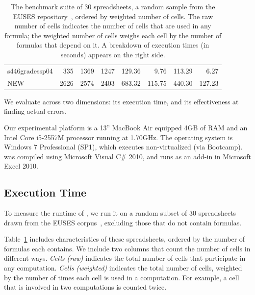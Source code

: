 \begin{table}[!t]
\begin{tabular}{l|rrr||r|rrr}
\small{s446gradessp04} & \small{335} & \small{1369} & \small{1247} & \small{129.36} & \small{9.76} & \small{113.29} & \small{6.27} \\ 
\small{NEW} & \small{2626} & \small{2574} & \small{2403} & \small{683.32} & \small{115.75} & \small{440.30} & \small{127.23} \\ 
    \end{tabular}%
  \caption{The benchmark suite of 30 spreadsheets, a random sample from the EUSES repository~\cite{Fisher:2005:ESC:1082983.1083242}, ordered by weighted number of cells. The raw number of cells indicates the number of cells that are used in any formula; the weighted number of cells weighs each cell by the number of formulas that depend on it. A breakdown of \checkcell{} execution times (in seconds) appears on the right side.\label{tab:spreadsheet_characteristics}}
\end{table}

We evaluate \checkcell{} across two dimensions: its execution time,
and its effectiveness at finding actual errors.

Our experimental platform is a 13'' MacBook Air equipped 4GB of RAM
and an Intel Core i5-2557M processor running at 1.70GHz. The operating
system is Windows 7 Professional (SP1), which executes non-virtualized
(via Bootcamp). \checkcell{} was compiled using Microsoft Visual C\#
2010, and runs as an add-in in Microsoft Excel 2010.

\subsection{Execution Time}
\label{sec:execution_time}

To measure the runtime of \checkcell{}, we run it on a random subset
of 30 spreadsheets drawn from the EUSES
corpus~\cite{Fisher:2005:ESC:1082983.1083242}, excluding those that do not contain
formulas.

Table~\ref{tab:spreadsheet_characteristics} includes characteristics
of these spreadsheets, ordered by the number of formulas each
contains. We include two columns that count the number of cells in
different ways. \emph{Cells (raw)} indicates the total number of cells
that participate in any computation. \emph{Cells (weighted)} indicates
the total number of cells, weighted by the number of times each cell
is used in a computation. For example, a cell that is involved in two
computations is counted twice.

